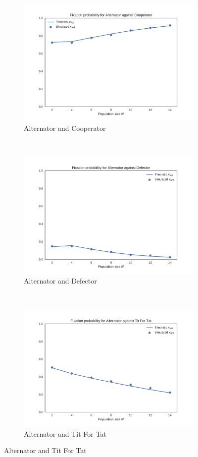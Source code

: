 \documentclass{article}
\begin{document}
{\begin{figure}[!hbtp]
    \centering
    \begin{subfigure}[t]{.3\textwidth}
        \centering
        \includegraphics[width=.8\textwidth]{../img/Alternator_v_Cooperator_1000_repetitions.pdf}
        \caption{Alternator and Cooperator}
    \end{subfigure}%
    ~
    \begin{subfigure}[t]{.3\textwidth}
        \centering
        \includegraphics[width=.8\textwidth]{../img/Alternator_v_Defector_1000_repetitions.pdf}
        \caption{Alternator and Defector}
    \end{subfigure}%
    ~
    \begin{subfigure}[t]{.3\textwidth}
        \centering
        \includegraphics[width=.8\textwidth]{../img/Alternator_v_Tit_For_Tat_1000_repetitions.pdf}
        \caption{Alternator and Tit For Tat}
    \end{subfigure}%


\end{figure}}
\end{document}
